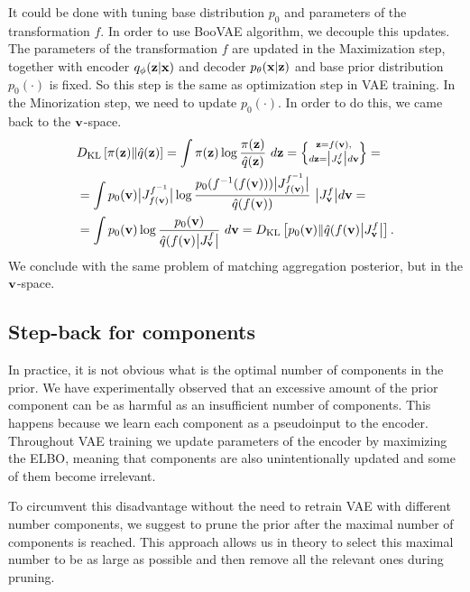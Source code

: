It could be done with tuning base distribution $p_0$ and parameters of the transformation $f$. In order to use BooVAE algorithm, we decouple this updates. The parameters of the transformation $f$ are updated in the Maximization step, together with encoder $q_{\phi}({\mathbf{z}}|{\mathbf{x}})$ and decoder $p_{\theta}({\mathbf{x}}|{\mathbf{z}})$ and base prior distribution $p_0(\cdot)$ is fixed. So this step is the same as optimization step in VAE training. In the Minorization step, we need to update $p_0(\cdot)$. In order to do this, we came back to the ${\mathbf{v}}$-space.
\begin{equation}
    \begin{aligned}
    & D_{\mathrm{KL}}\left[\pi({\mathbf{z}})\|\hat{q}({\mathbf{z}})\right] = \int \pi({\mathbf{z}})\log\frac{\pi({\mathbf{z}})}{\hat{q}({\mathbf{z}})}~d{\mathbf{z}} = \Big\{\substack{{\mathbf{z}} = f({\mathbf{v}}), \\ d{\mathbf{z}}=\big|J^{f}_{{\mathbf{v}}}\big|d{\mathbf{v}}}\Big\} = \\
    & = \int p_{0}({\mathbf{v}})\big|J^{f^{-1}}_{f({\mathbf{v}})}\big|\log \frac{p_{0}(f^{-1}(f({\mathbf{v}})))\big|J^{f^{-1}}_{f({\mathbf{v}})}\big|}{\hat{q}(f({\mathbf{v}}))}~\big|J^{f}_{{\mathbf{v}}}\big|d{\mathbf{v}} = \\
    & = \int p_0({\mathbf{v}})\log\frac{p_0({\mathbf{v}})}{\hat{q}(f({\mathbf{v}})\big|J^{f}_{{\mathbf{v}}}\big|}~d{\mathbf{v}} =  D_{\mathrm{KL}}\left[p_0({\mathbf{v}})\|\hat{q}(f({\mathbf{v}})\big|J^{f}_{{\mathbf{v}}}\big|\right].
    \end{aligned}
\end{equation}
We conclude with the same problem of matching aggregation posterior, but in the ${\mathbf{v}}$-space.

\newpage
\subsection{Step-back for components}
\label{app:stepback}
In practice, it is not obvious what is the optimal number of components in the prior. We have experimentally observed that an excessive amount of the prior component can be as harmful as an insufficient number of components. This happens because we learn each component as a pseudoinput to the encoder. Throughout VAE training we update parameters of the encoder by maximizing the ELBO, meaning that components are also unintentionally updated and some of them become irrelevant.

To circumvent this disadvantage without the need to retrain VAE with different number components,  we suggest to prune the prior after the maximal number of components is reached. This approach allows us in theory to select this maximal number to be as large as possible and then remove all the relevant ones during pruning. 


